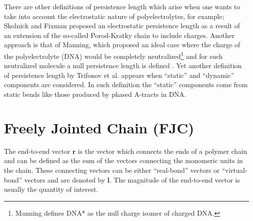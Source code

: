 
There are other definitions of persistence length which arise when one
wants   to   take   into   account   the   electrostatic   nature   of
polyelectrolytes, for example; Skolnick and Fixman \cite{skolnick1977}
proposed  an  electrostatic  persistence  length  as a  result  of  an
extension  of the  so-called  Porod-Kratky chain  to include  charges.
Another  approach is  that of  Manning, which  proposed an  ideal case
where  the charge  of the  polyelectrolyte (DNA)  would  be completely
neutralized\footnote{Manning defines DNA* as the null charge isomer of
  charged DNA.}  and for  such neutralized molecule a null persistence
length  is  defined  \cite{manning2006}.   Yet another  definition  of
persistence length by Trifonov et al. \cite{trifonov1987} appears when
``static''  and  ``dynamic''   components  are  considered.   In  such
definition the ``static'' components come from static bends like those
produced by phased A-tracts in DNA.

\section{Freely Jointed Chain (FJC)}
The end-to-end  vector $\mathbf{r}$ is  the vector which  connects the
ends of a polymer  chain and can be defined as the  sum of the vectors
connecting the monomeric units  in the chain. These connecting vectors
can be  either ``real-bond''  vectors or ``virtual-bond''  vectors and
are denoted  by $\mathbf{l}$.  The magnitude of  the end-to-end vector
is usually the quantity of interest.

